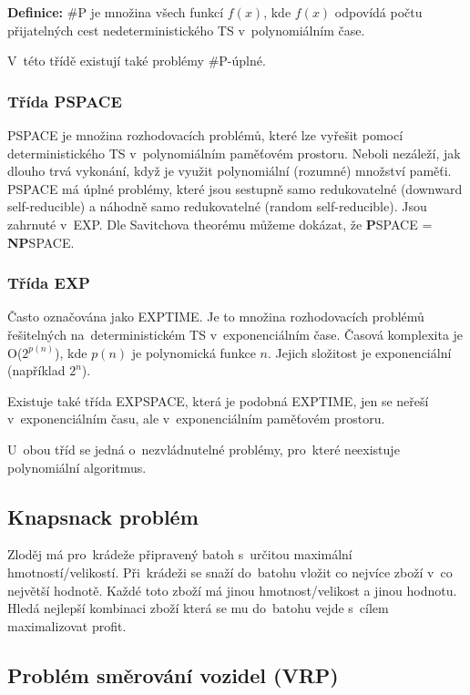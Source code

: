\textbf{Definice:} \#P je množina všech funkcí $f(x)$, kde $f(x)$ odpovídá počtu přijatelných cest nedeterministického TS v~polynomiálním čase.

V~této třídě existují také problémy \#P-úplné.

\subsubsection{Třída PSPACE}

PSPACE je množina rozhodovacích problémů, které lze vyřešit pomocí deterministického TS v~polynomiálním paměťovém prostoru.
Neboli nezáleží, jak dlouho trvá vykonání, když je využit polynomiální (rozumné) množství paměťi. 
PSPACE má úplné problémy, které jsou sestupně samo redukovatelné (downward self-reducible) a náhodně samo redukovatelné (random self-reducible).
Jsou zahrnuté v~EXP.
Dle Savitchova theorému můžeme dokázat, že \textbf{P}SPACE = \textbf{NP}SPACE.

\subsubsection{Třída EXP}

Často označována jako EXPTIME.
Je to množina rozhodovacích problémů řešitelných na~deterministickém TS v~exponenciálním čase.
Časová komplexita je O($2^{p(n)}$), kde $p(n)$ je polynomická funkce $n$.
Jejich složitost je exponenciální (například $2^n$).

Existuje také třída EXPSPACE, která je podobná EXPTIME, jen se neřeší v~exponenciálním času, ale v~exponenciálním paměťovém prostoru.

U~obou tříd se jedná o~nezvládnutelné problémy, pro~které neexistuje polynomiální algoritmus.

\subsection{Knapsnack problém}

Zloděj má pro~krádeže připravený batoh s~určitou maximální hmotností/velikostí.
Při~krádeži se snaží do~batohu vložit co nejvíce zboží v~co největší hodnotě.
Každé toto zboží má jinou hmotnost/velikost a jinou hodnotu.
Hledá nejlepší kombinaci zboží která se mu do~batohu vejde s~cílem maximalizovat profit.

\subsection{Problém směrování vozidel (VRP)}


